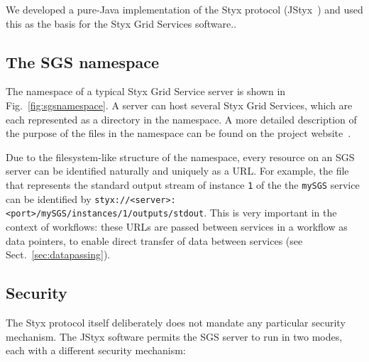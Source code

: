 \documentclass[a4paper]{article}
\begin{document}
We developed a pure-Java implementation of the Styx protocol (JStyx~\cite{JStyx}) and used this as the basis for the Styx Grid Services software..

\subsection{The SGS namespace}\label{sec:sgsnamespace}
The namespace of a typical Styx Grid Service server is shown in Fig.~\ref{fig:sgsnamespace}.  A server can host several Styx Grid Services, which are each represented as a directory in the namespace.  A more detailed description of the purpose of the files in the namespace can be found on the project website~\cite{sgswebsite}.


Due to the filesystem-like structure of the namespace, every resource on an SGS server can be identified naturally and uniquely as a URL.  For example, the file that represents the standard output stream of instance \texttt{1} of the the \texttt{mySGS} service can be identified by \texttt{styx://<server>:<port>/mySGS/instances/1/outputs/stdout}.  This is very important in the context of workflows: these URLs are passed between services in a workflow as data pointers, to enable direct transfer of data between services (see Sect.~\ref{sec:datapassing}).

\subsection{Security}\label{sec:security}
The Styx protocol itself deliberately does not mandate any particular security mechanism.  The JStyx software permits the SGS server to run in two modes, each with a different security mechanism:
\end{document}
